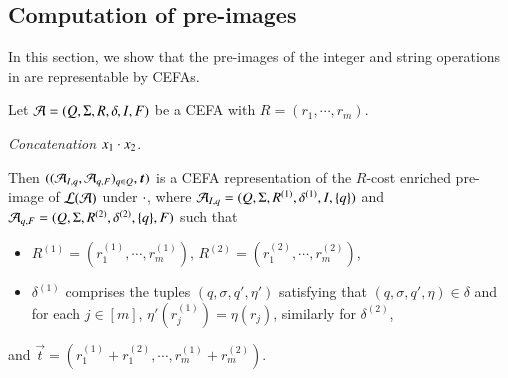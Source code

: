 



\subsection{Computation of pre-images}
In this section, we show that the pre-images of the integer and string operations in {\slint} are representable by CEFAs. %

Let $\mathcal{A}=(Q, \Sigma, R, \delta, I, F)$ be a CEFA with $R= (r_1, \cdots, r_m)$. 

\smallskip
\noindent \emph{Concatenation $x_1 \cdot x_2$}.

\smallskip

Then $((\Aut_{I, q}, \Aut_{q, F})_{q \in Q}, \vec{t})$ is a CEFA representation of the $R$-cost enriched pre-image of $\mathcal{L}(\mathcal{A})$ under $\cdot$, where $\mathcal{A}_{I, q}=(Q, \Sigma, R^{(1)}, \delta^{(1)}, I, \{q\})$ and  $\mathcal{A}_{q, F}=(Q, \Sigma, R^{(2)}, \delta^{(2)}, \{q\}, F)$ such that 
\begin{itemize}
\item $R^{(1)} = (r^{(1)}_1, \cdots, r^{(1)}_m)$, $R^{(2)} = (r^{(2)}_1, \cdots, r^{(2)}_m)$, 
\item $\delta^{(1)}$ comprises the tuples $(q, \sigma, q', \eta')$ satisfying that $(q, \sigma, q', \eta) \in \delta$ and for each $j \in [m]$, $\eta'(r^{(1)}_j)=\eta(r_j)$,  similarly for $\delta^{(2)}$,
\end{itemize}
and $\vec{t} = (r^{(1)}_1 + r^{(2)}_1, \cdots, r^{(1)}_m + r^{(2)}_m)$.


